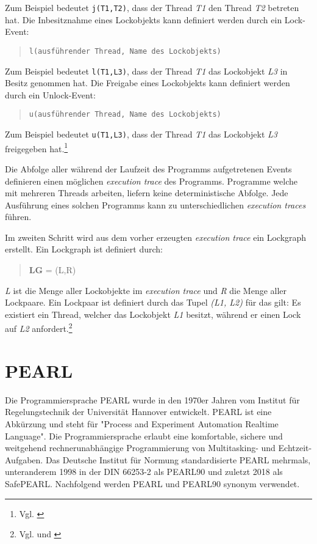 Zum Beispiel bedeutet \texttt{j(T1,T2)}, dass der Thread \emph{T1} den Thread
\emph{T2} betreten hat. Die Inbesitznahme eines Lockobjekts kann definiert
werden durch ein Lock-Event:
\begin{quote}
\texttt{l(ausführender Thread, Name des Lockobjekts)}
\end{quote}
Zum Beispiel bedeutet \texttt{l(T1,L3)}, dass der Thread \emph{T1} das
Lockobjekt \emph{L3} in Besitz genommen hat. Die Freigabe eines Lockobjekts kann
definiert werden durch ein Unlock-Event:
\begin{quote}
\texttt{u(ausführender Thread, Name des Lockobjekts)}
\end{quote}
Zum Beispiel bedeutet \texttt{u(T1,L3)}, dass der Thread \emph{T1} das
Lockobjekt \emph{L3} freigegeben hat.\footnote{Vgl.
\autocite[212]{bensalem2005dynamic}}

Die Abfolge aller während der Laufzeit des Programms aufgetretenen Events
definieren einen möglichen \emph{execution trace} des Programms. Programme
welche mit mehreren Threads arbeiten, liefern keine deterministische Abfolge.
Jede Ausführung eines solchen Programms kann zu unterschiedlichen
\emph{execution traces} führen. 

Im zweiten Schritt wird aus dem vorher erzeugten \emph{execution trace} ein
Lockgraph erstellt. Ein Lockgraph ist definiert durch:
\begin{quote}
\textbf{LG} = (L,R)
\end{quote}
\emph{L} ist die Menge aller Lockobjekte im \emph{execution trace} und \emph{R}
die Menge aller Lockpaare. Ein Lockpaar ist definiert durch das Tupel \emph{(L1,
L2)} für das gilt: Es existiert ein Thread, welcher das Lockobjekt \emph{L1}
besitzt, während er einen Lock auf \emph{L2} anfordert.\footnote{Vgl.
\autocite[72]{coffman1971system} und \autocite[213]{bensalem2005dynamic}}

\section{PEARL}
\label{section:PEARL}
Die Programmiersprache PEARL wurde in den 1970er Jahren vom Institut für
Regelungstechnik der Universität Hannover entwickelt\autocite{PEARLHistory}.
PEARL ist eine Abkürzung und steht für "Process and Experiment Automation
Realtime Language". Die Programmiersprache erlaubt eine komfortable, sichere und
weitgehend rechnerunabhängige Programmierung von Multitasking- und
Echtzeit-Aufgaben. Das Deutsche Institut für Normung standardisierte PEARL
mehrmals, unteranderem 1998 in der DIN 66253-2 als
PEARL90\autocite{DIN-66253-2:1998-04} und zuletzt 2018 als
SafePEARL\autocite{DIN-66253:2018-03}. Nachfolgend werden PEARL und PEARL90
synonym verwendet. 

